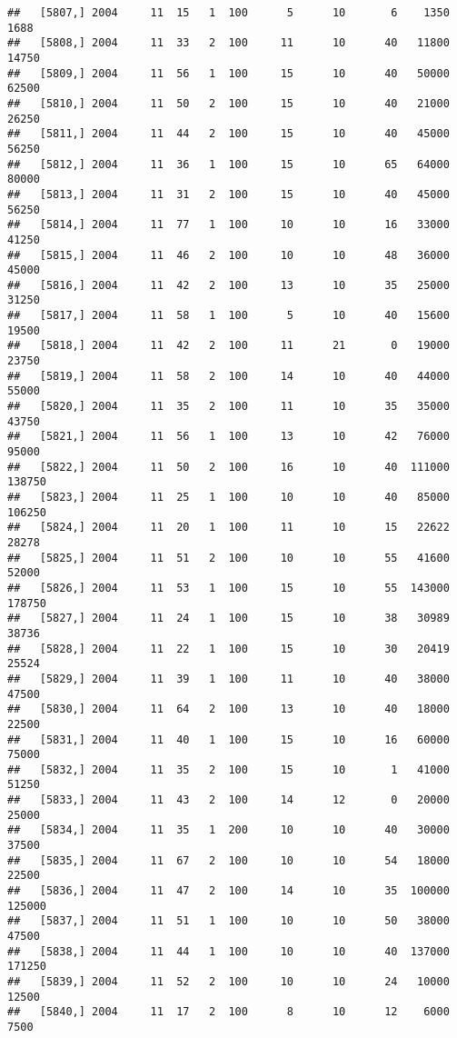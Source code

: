 \documentclass{article}\usepackage[]{graphicx}\usepackage[]{color}
\makeatletter
\newenvironment{kframe}{%
 \def\at@end@of@kframe{}%
 \ifinner\ifhmode%
  \def\at@end@of@kframe{\end{minipage}}%
  \begin{minipage}{\columnwidth}%
 \fi\fi%
 \def\FrameCommand##1{\hskip\@totalleftmargin \hskip-\fboxsep
 \colorbox{shadecolor}{##1}\hskip-\fboxsep
     \hskip-\linewidth \hskip-\@totalleftmargin \hskip\columnwidth}%
 \MakeFramed {\advance\hsize-\width
   \@totalleftmargin\z@ \linewidth\hsize
   \@setminipage}}%
 {\par\unskip\endMakeFramed%
 \at@end@of@kframe}
\newenvironment{knitrout}{}{} %
\makeatother
\begin{document}
\begin{knitrout}
\begin{kframe}
\begin{verbatim}
##   [5807,] 2004     11  15   1  100      5      10       6    1350    1688
##   [5808,] 2004     11  33   2  100     11      10      40   11800   14750
##   [5809,] 2004     11  56   1  100     15      10      40   50000   62500
##   [5810,] 2004     11  50   2  100     15      10      40   21000   26250
##   [5811,] 2004     11  44   2  100     15      10      40   45000   56250
##   [5812,] 2004     11  36   1  100     15      10      65   64000   80000
##   [5813,] 2004     11  31   2  100     15      10      40   45000   56250
##   [5814,] 2004     11  77   1  100     10      10      16   33000   41250
##   [5815,] 2004     11  46   2  100     10      10      48   36000   45000
##   [5816,] 2004     11  42   2  100     13      10      35   25000   31250
##   [5817,] 2004     11  58   1  100      5      10      40   15600   19500
##   [5818,] 2004     11  42   2  100     11      21       0   19000   23750
##   [5819,] 2004     11  58   2  100     14      10      40   44000   55000
##   [5820,] 2004     11  35   2  100     11      10      35   35000   43750
##   [5821,] 2004     11  56   1  100     13      10      42   76000   95000
##   [5822,] 2004     11  50   2  100     16      10      40  111000  138750
##   [5823,] 2004     11  25   1  100     10      10      40   85000  106250
##   [5824,] 2004     11  20   1  100     11      10      15   22622   28278
##   [5825,] 2004     11  51   2  100     10      10      55   41600   52000
##   [5826,] 2004     11  53   1  100     15      10      55  143000  178750
##   [5827,] 2004     11  24   1  100     15      10      38   30989   38736
##   [5828,] 2004     11  22   1  100     15      10      30   20419   25524
##   [5829,] 2004     11  39   1  100     11      10      40   38000   47500
##   [5830,] 2004     11  64   2  100     13      10      40   18000   22500
##   [5831,] 2004     11  40   1  100     15      10      16   60000   75000
##   [5832,] 2004     11  35   2  100     15      10       1   41000   51250
##   [5833,] 2004     11  43   2  100     14      12       0   20000   25000
##   [5834,] 2004     11  35   1  200     10      10      40   30000   37500
##   [5835,] 2004     11  67   2  100     10      10      54   18000   22500
##   [5836,] 2004     11  47   2  100     14      10      35  100000  125000
##   [5837,] 2004     11  51   1  100     10      10      50   38000   47500
##   [5838,] 2004     11  44   1  100     10      10      40  137000  171250
##   [5839,] 2004     11  52   2  100     10      10      24   10000   12500
##   [5840,] 2004     11  17   2  100      8      10      12    6000    7500

\end{verbatim}
\end{kframe}
\end{knitrout}
\end{document}

